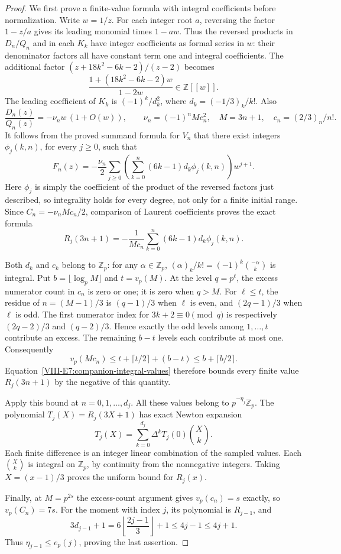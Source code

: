\documentclass[11pt,letterpaper]{article}
\numberwithin{equation}{section}
\begin{document}
\begin{proof}
We first prove a finite-value formula with integral coefficients before
normalization. Write $w=1/z$. For each integer root $a$, reversing the
factor $1-z/a$ gives its leading monomial times $1-aw$.
Thus the reversed products in $D_n/Q_n$ and in each $K_k$ have integer
coefficients as formal series in $w$: their denominator factors all have
constant term one and integral coefficients. The additional factor
$(z+18k^2-6k-2)/(z-2)$ becomes
\[
 \frac{1+(18k^2-6k-2)w}{1-2w}\in\mathbb Z[[w]].
\]
The leading coefficient of $K_k$ is $(-1)^k/d_k^2$, where
$d_k=(-1/3)_k/k!$. Also
\[
 \frac{D_n(z)}{Q_n(z)}
 =-\nu_nw\,(1+O(w)),\qquad
 \nu_n=(-1)^nM c_n^2,
 \quad M=3n+1,\quad c_n=(2/3)_n/n!.
\]
It follows from the proved summand formula for $V_n$ that there exist
integers $\phi_j(k,n)$, for every $j\ge0$, such that
\[
 F_n(z)=-\frac{\nu_n}{2}\sum_{j\ge0}
 \left(\sum_{k=0}^n(6k-1)d_k\phi_j(k,n)\right)w^{j+1}.
\]
Here $\phi_j$ is simply the coefficient of the product of the reversed
factors just described, so integrality holds for every degree, not only
for a finite initial range. Since $C_n=-\nu_n M c_n/2$, comparison of
Laurent coefficients proves the exact formula
\begin{equation}\label{VIII-E7:companion-integral-values}
 R_j(3n+1)=-\frac1{M c_n}
 \sum_{k=0}^n(6k-1)d_k\phi_j(k,n).
\end{equation}

Both $d_k$ and $c_k$ belong to $\mathbb Z_p$: for any
$\alpha\in\mathbb Z_p$, $(\alpha)_k/k!=(-1)^k\binom{-\alpha}{k}$
is integral. Put $b=\lfloor\log_p M\rfloor$ and $t=v_p(M)$.
At the level $q=p^\ell$, the excess numerator count in $c_n$
is zero or one; it is zero when $q>M$.
For $\ell\le t$, the residue of $n=(M-1)/3$ is
$(q-1)/3$ when $\ell$ is even, and $(2q-1)/3$ when $\ell$ is odd.
The first numerator index for $3k+2\equiv0\pmod q$ is respectively
$(2q-2)/3$ and $(q-2)/3$. Hence exactly the odd levels among
$1,\ldots,t$ contribute an excess. The remaining $b-t$ levels each
contribute at most one. Consequently
\[
 v_p(Mc_n)\le t+\lceil t/2\rceil+(b-t)
 \le b+\lceil b/2\rceil.
\]
Equation~\eqref{VIII-E7:companion-integral-values} therefore bounds every
finite value $R_j(3n+1)$ by the negative of this quantity.

Apply this bound at $n=0,1,\ldots,d_j$. All these values belong to
$p^{-\eta_j}\mathbb Z_p$. The polynomial $T_j(X)=R_j(3X+1)$ has
exact Newton expansion
\[
 T_j(X)=\sum_{k=0}^{d_j}\Delta^kT_j(0)\binom Xk.
\]
Each finite difference is an integer linear combination of the sampled
values. Each $\binom Xk$ is integral on $\mathbb Z_p$, by continuity
from the nonnegative integers. Taking $X=(x-1)/3$ proves the uniform
bound for $R_j(x)$.

Finally, at $M=p^{2s}$ the excess-count argument gives
$v_p(c_n)=s$ exactly, so $v_p(C_n)=7s$.
For the moment with index $j$, its polynomial is $R_{j-1}$, and
\[
 3d_{j-1}+1
 =6\left\lfloor\frac{2j-1}{3}\right\rfloor+1
 \le4j-1\le4j+1.
\]
Thus $\eta_{j-1}\le e_p(j)$, proving the last assertion.
\end{proof}
\end{document}
